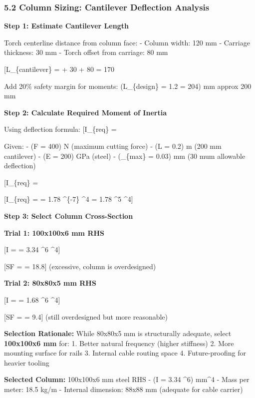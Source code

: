 \documentclass[
]{article}
\begin{document}
\subsubsection{5.2 Column Sizing: Cantilever Deflection
Analysis}\label{column-sizing-cantilever-deflection-analysis}

\textbf{Step 1: Estimate Cantilever Length}

Torch centerline distance from column face: - Column width: 120 mm -
Carriage thickness: 30 mm - Torch offset from carriage: 80 mm

{[}L\_\{cantilever\} =  + 30 + 80 = 170 \text{ mm}{]}

Add 20\% safety margin for moments: (L\_\{design\} = 1.2  =
204) mm approx 200 mm

\textbf{Step 2: Calculate Required Moment of Inertia}

Using deflection formula: {[}I\_\{req\} =
\frac{F L^3}{3 E \delta_{max}}{]}

Given: - (F = 400) N (maximum cutting force) - (L = 0.2) m (200 mm
cantilever) - (E = 200) GPa (steel) - (\delta\_\{max\} = 0.03) mm (30
mum allowable deflection)

{[}I\_\{req\} =
\frac{400 \times 0.2^3}{3 \times 200 \times 10^9 \times 0.00003}{]}

{[}I\_\{req\} =  = 1.78 \^{}\{-7\}
\^{}4 = 1.78 \^{}5 \^{}4{]}

\textbf{Step 3: Select Column Cross-Section}

\textbf{Trial 1: 100x100x6 mm RHS}

{[}I =  = 3.34 \^{}6 \^{}4{]}

{[}SF =  = 18.8{]} (excessive,
column is overdesigned)

\textbf{Trial 2: 80x80x5 mm RHS}

{[}I =  = 1.68 \^{}6 \^{}4{]}

{[}SF =  = 9.4{]} (still
overdesigned but more reasonable)

\textbf{Selection Rationale:} While 80x80x5 mm is structurally adequate,
select \textbf{100x100x6 mm} for: 1. Better natural frequency (higher
stiffness) 2. More mounting surface for rails 3. Internal cable routing
space 4. Future-proofing for heavier tooling

\textbf{Selected Column:} 100x100x6 mm steel RHS - (I = 3.34
\^{}6) mm\^{}4 - Mass per meter: 18.5 kg/m - Internal
dimension: 88x88 mm (adequate for cable carrier)
\end{document}
